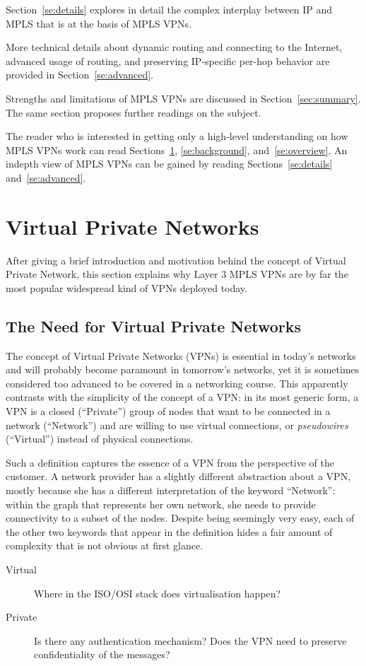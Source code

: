 \documentclass{article}
\begin{document}
Section~\ref{se:details} explores in detail the complex interplay between IP and MPLS that
is at the basis of MPLS VPNs.

More technical details about dynamic routing and connecting to the Internet, 
advanced usage of routing, and preserving IP-specific per-hop behavior are 
provided in Section~\ref{se:advanced}. 


Strengths and limitations of MPLS VPNs are discussed in Section~\ref{sec:summary}. The
same section proposes further readings on the subject.

The reader who is interested in getting only a high-level understanding on how MPLS VPNs work can
read Sections~\ref{se:intro}, \ref{se:background}, and~\ref{se:overview}. An indepth view
of MPLS VPNs can be gained by reading Sections~\ref{se:details} and~\ref{se:advanced}.

\section{Virtual Private Networks}\label{se:intro}

After giving a brief introduction and motivation behind the concept of Virtual 
Private Network, this section explains why Layer 3 MPLS VPNs are by far the most 
popular widespread kind of VPNs deployed today.


\subsection{The Need for Virtual Private Networks}
The concept of Virtual Private Networks (VPNs) is essential in today's 
networks and will probably become paramount in tomorrow's networks, yet it is 
sometimes considered too advanced to be covered in a networking course. This 
apparently contrasts with the simplicity of the concept of a VPN: in its most 
generic form, a VPN is a closed (``Private'') group of nodes
that want to be connected in a network (``Network'') and are willing to use 
virtual connections, or \emph{pseudowires} (``Virtual'') instead of physical 
connections. 

Such a definition captures the essence of a VPN from the perspective of the 
customer. A network provider has a slightly different abstraction about a VPN, 
mostly because she has a different interpretation of the keyword ``Network'': 
within the graph that represents her own network, she needs to provide 
connectivity to a subset of the nodes. Despite being seemingly very easy, each 
of the other two keywords that appear in the definition hides a fair amount of 
complexity that is not obvious at first glance. 
\begin{description}
 \item[Virtual] Where in the ISO/OSI stack does virtualisation happen?
 \item[Private] Is there any authentication mechanism? Does the VPN
need to preserve confidentiality of the messages?
 \end{description}
\end{document}
